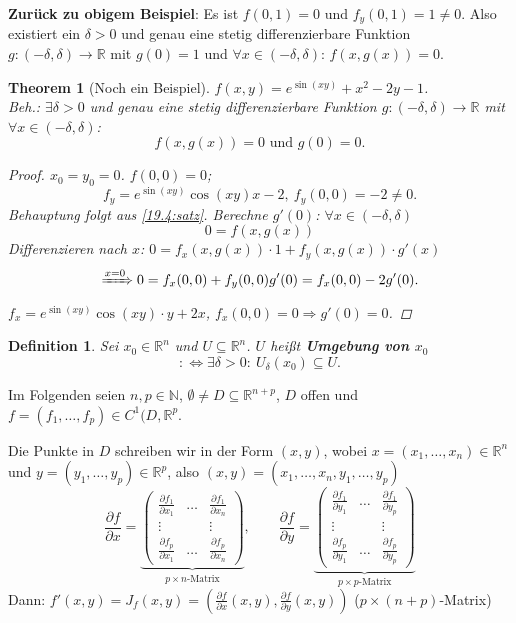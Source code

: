 \documentclass[12pt]{extreport} %
\newcommand{\N}{\mathbb{N}}
\newcommand{\R}{\mathbb{R}}
\theoremstyle{named}
\theoremstyle{nnamed}
\newtheorem*{unnamedtheorem*}{Theorem}
\theoremstyle{itshape}
\newtheorem*{definition}{Definition}
\theoremstyle{normal}
\begin{document}
\textbf{Zurück zu obigem Beispiel}: Es ist $f(0, 1) = 0$ und $f_{y}(0, 1) = 1 \neq 0$. Also existiert ein $\delta > 0$ und genau eine stetig differenzierbare Funktion $g \colon (-\delta, \delta) \rightarrow \R$ mit $g(0) = 1$ und $\forall x \in (-\delta, \delta)$: $f(x, g(x)) = 0$. 

\bigskip

\begin{unnamedtheorem*}[Noch ein Beispiel]	
	$f(x, y) = e^{\sin(xy)} + x^{2} - 2y - 1$. ~\\
	Beh.: $\exists \delta > 0$ und genau eine stetig differenzierbare Funktion $g \colon (-\delta, \delta) \rightarrow \R$ mit $\forall x \in (-\delta, \delta)$:
	$$ f(x, g(x)) = 0 \text{ und } g(0) = 0. $$
	\begin{proof}
		$x_{0} = y_{0} = 0$. $f(0, 0) = 0$; 
	$$f_{y} = e^{\sin(xy)} \cos(xy) x - 2, ~ f_{y}(0, 0) = -2 \neq 0. $$
	Behauptung folgt aus \ref{19.4:satz}. Berechne $g'(0)$: $\forall x \in (-\delta, \delta)$
	$$ 0 = f(x, g(x)) $$
	Differenzieren nach $x$: $0 = f_{x}(x, g(x)) \cdot 1 + f_{y}(x, g(x)) \cdot g'(x)$
	$$ \xRightarrow[]{x = 0} 0 = f_{x}(0, 0) + f_{y}(0, 0) g'(0) = f_{x}(0, 0) - 2 g'(0). $$
	$f_{x} = e^{\sin(xy)} \cos(xy) \cdot y + 2x$, $f_{x}(0, 0) = 0 \Rightarrow g'(0) = 0$.
	\end{proof} 
\end{unnamedtheorem*} 

\begin{definition}
	Sei $x_{0} \in \R^{n}$ und $U \subseteq \R^{n}$. $U$ hei{\ss}t \textbf{Umgebung von $x_{0}$} 
	$$ :\iff \exists \delta > 0: ~ U_{\delta}(x_{0}) \subseteq U. $$
\end{definition}

Im Folgenden seien $n, p \in \N$, $\emptyset \neq D \subseteq \R^{n+p}$, $D$ offen und $f = (f_{1}, \dotsc, f_{p}) \in C^{1}(D, \R^{p}$. 

\bigskip

Die Punkte in $D$ schreiben wir in der Form $(x, y)$, wobei $x = (x_{1}, \dotsc, x_{n}) \in \R^{n}$ und $y = (y_{1}, \dotsc, y_{p}) \in \R^{p}$, also $(x, y) = (x_{1}, \dotsc, x_{n}, y_{1}, \dotsc, y_{p})$
	$$ \frac{\partial f}{\partial x} = \underbrace{\begin{pmatrix} \frac{\partial f_{1}}{\partial x_{1}} & \dotsc & \frac{\partial f_{1}}{\partial x_{n}} \\ \vdots & ~ & \vdots \\ \frac{\partial f_{p}}{\partial x_{1}} & \dotsc & \frac{\partial f_{p}}{\partial x_{n}}  \end{pmatrix}}_{p \times n\text{-Matrix}}, \qquad \frac{\partial f}{\partial y} = \underbrace{\begin{pmatrix} \frac{\partial f_{1}}{\partial y_{1}} & \dotsc & \frac{\partial f_{1}}{\partial y_{p}} \\ \vdots & ~ & \vdots \\ \frac{\partial f_{p}}{\partial y_{1}} & \dotsc & \frac{\partial f_{p}}{\partial y_{p}}  \end{pmatrix}}_{p \times p\text{-Matrix}} $$
Dann: $f'(x, y) = J_{f}(x, y) = \left( \frac{\partial f}{\partial x}(x, y), \frac{\partial f}{\partial y} (x, y) \right)$ ($p \times (n + p)$-Matrix)
\end{document}
